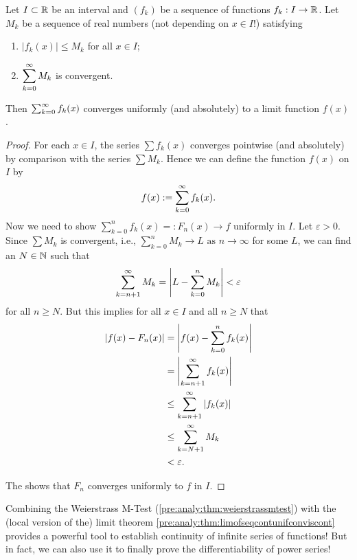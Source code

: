 \documentclass[10pt, a4paper]{article}
\newcommand{\limas}[3][n]{#2 \rightarrow #3 \text{ as } #1 \rightarrow \infty}
\newcommand{\infsumo}{\infsum[k = 0]}
\begin{document}
\begin{theorem}\label{pre:analy:thm:weierstrassmtest}
    Let $I \subset \R$ be an interval and $(f_k)$ be a sequence of functions $f_k : I \rightarrow \R$.
    Let $M_k$ be a sequence of real numbers
    (not depending on $x \in I$!)
    satisfying
    \begin{enumerate}[label = (\roman*)]
        \item $|f_k(x)| \leq M_k$ for all $x \in I$;
        \item $\displaystyle\infsumo M_k$ is convergent.
    \end{enumerate}
    Then $\infsumo f_k(x)$ converges uniformly
    (and absolutely)
    to a limit function $f(x)$.

    \begin{proof}
        For each $x \in I$,
        the series $\sum f_k(x)$ converges pointwise
        (and absolutely)
        by comparison with the series $\sum M_k$.
        Hence we can define the function $f(x)$ on $I$ by
        \[
        f(x) := \infsumo f_k(x).
        \]
        Now we need to show $\sum_{k = 0}^{n}f_k(x) =: F_n(x) \rightarrow f$ uniformly in $I$.
        Let $\varepsilon > 0$.
        Since $\sum M_k$ is convergent,
        i.e.,
        $\limas{\sum_{k = 0}^{n}M_k}{L}$ for some $L$,
        we can find an $N \in \N$ such that
        \[
        \infsum[k = n + 1]M_k = \left|L - \sum_{k = 0}^{n}M_k\right| < \varepsilon
        \]
        for all $n \geq N$.
        But this implies for all $x \in I$ and all $n \geq N$ that
        \begin{align*}
            |f(x) - F_n(x)| &= \left|f(x) - \sum_{k = 0}^{n}f_k(x)\right| \\
            &= \left|\infsum[k = n + 1]f_k(x)\right| \\
            &\leq \infsum[k = n + 1]|f_k(x)| \\
            &\leq \infsum[k = N + 1]M_k \\
            &< \varepsilon.
        \end{align*}

        The shows that $F_n$ converges uniformly to $f$ in $I$.
    \end{proof}
\end{theorem}

Combining the Weierstrass M-Test
(\autoref{pre:analy:thm:weierstrassmtest})
with the
(local version of the)
limit theorem \autoref{pre:analy:thm:limofseqcontunifconviscont} provides a powerful tool to establish continuity of infinite series of functions!
But in fact,
we can also use it to finally prove the differentiability of power series!
\end{document}

